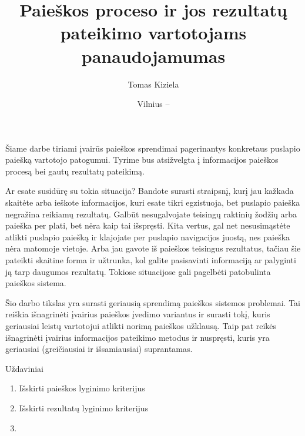 \documentclass{VUMIFPSkursinis}
\title{Paieškos proceso ir jos rezultatų pateikimo vartotojams panaudojamumas}
\author{Tomas Kiziela}
\date{Vilnius – \the\year}
\begin{document}
	
\maketitle
\cleardoublepage{}
\setcounter{page}{2}

\tableofcontents

Šiame darbe tiriami įvairūs paieškos sprendimai pagerinantys konkretaus puslapio paiešką vartotojo patogumui. Tyrime bus atsižvelgta į informacijos paieškos procesą bei gautų rezultatų pateikimą.


Ar esate susidūrę su tokia situacija? Bandote surasti straipsnį, kurį jau kažkada skaitėte arba ieškote informacijos, kuri esate tikri egzistuoja, bet puslapio paieška negražina reikiamų rezultatų. Galbūt nesugalvojate teisingų raktinių žodžių arba paieška per plati, bet nėra kaip tai išspręsti. Kita vertus, gal net nesusimąstėte atlikti puslapio paiešką ir klajojate per puslapio navigacijos juostą, nes paieška nėra matomoje vietoje. Arba jau gavote iš paieškos teisingus rezultatus, tačiau šie pateikti skaitine forma ir užtrunka, kol galite pasisavinti informaciją ar palyginti ją tarp daugumos rezultatų. Tokiose situacijose gali pagelbėti patobulinta paieškos sistema.


Šio darbo tikslas yra surasti geriausią sprendimą paieškos sistemos problemai. Tai reiškia išnagrinėti įvairius paieškos įvedimo variantus ir surasti tokį, kuris geriausiai leistų vartotojui atlikti norimą paieškos užklausą. Taip pat reikės išnagrinėti įvairius informacijos pateikimo metodus ir nuspręsti, kuris yra geriausiai (greičiausiai ir išsamiausiai) suprantamas.

Uždaviniai
\begin{enumerate}
	\item Išskirti paieškos lyginimo kriterijus
	\item Išskirti rezultatų lyginimo kriterijus
	\item 
\end{enumerate}
\end{document}
